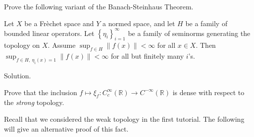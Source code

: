 \documentclass[12pt, reqno,a4paper, twoside]{amsproc}
\newcommand{\dbR}{\mathbb R}
\newcommand{\set}[1]{\left\{{#1}\right\}}
\newcommand{\norm}[1]{\left\|#1\right\|}
\newenvironment{sol}{\sc Solution. \rm}{\hfill \qedsymbol\bigskip}
\begin{document}
\begin{exer}Prove the following variant of the Banach-Steinhaus Theorem.
	
	Let $X$ be a Fr\`echet space and $Y$ a normed space, and let $H$ be a family of bounded linear operators. Let $\set{\eta_i}_{i=1}^\infty$ be a family of seminorms generating the topology on $X$.  Assume $\sup_{f\in H}\norm{f(x)}<\infty$ for all $x\in X$. Then $\sup_{f\in H,\: \eta_i(x)=1}\norm{f(x)}<\infty$ for all but finitely many $i$'s.
\end{exer}

\begin{sol}
	
\end{sol}


\begin{exer}
	Prove that the inclusion $f\mapsto\xi_f:C_c^\infty(\dbR)\to C^{-\infty}(\dbR)$ is dense with respect to the \emph{strong} topology.
\end{exer}
\begin{rem}Recall that we considered the weak topology in the first tutorial. The following will give an alternative proof of this fact.
\end{rem}
\end{document}
